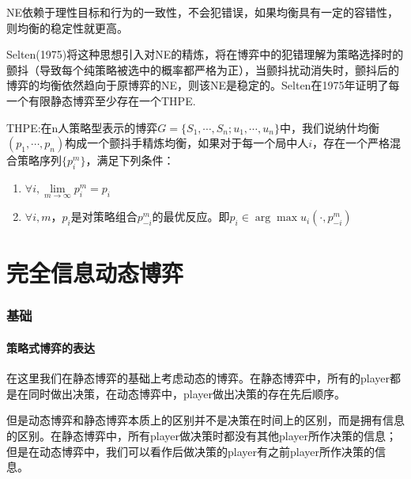\documentclass[UTF8,12pt]{ctexart}
\numberwithin{equation}{section} %
\numberwithin{figure}{section}
\numberwithin{table}{section}
\begin{document}
	NE依赖于理性目标和行为的一致性，不会犯错误，如果均衡具有一定的容错性，则均衡的稳定性就更高。
	
	Selten(1975)将这种思想引入对NE的精炼，将在博弈中的犯错理解为策略选择时的颤抖（导致每个纯策略被选中的概率都严格为正），当颤抖扰动消失时，颤抖后的博弈的均衡依然趋向于原博弈的NE，则该NE是稳定的。Selten在1975年证明了每一个有限静态博弈至少存在一个THPE.
	
	THPE:在n人策略型表示的博弈$G = \{S_1,\cdots,S_n;u_1,\cdots,u_n\}$中，我们说纳什均衡$(p_1,\cdots,p_n)$构成一个颤抖手精炼均衡，如果对于每一个局中人$i$，存在一个严格混合策略序列$\{p_i^m\}$，满足下列条件：
	\begin{enumerate}
		\item $\forall i,\lim\limits_{m \to \infty}p_i^m = p_i$
		
		\item $\forall i,m$，$p_i$是对策略组合$p^m_{-i}$的最优反应。即$p_i \in \arg \max u_i(\cdot,p^m_{-i})$
	\end{enumerate}

	\newpage
	
	\part{完全信息动态博弈}
	
	\section{基础}
	\subsection{策略式博弈的表达}
	在这里我们在静态博弈的基础上考虑动态的博弈。在静态博弈中，所有的player都是在同时做出决策，在动态博弈中，player做出决策的存在先后顺序。
	
	但是动态博弈和静态博弈本质上的区别并不是决策在时间上的区别，而是拥有信息的区别。在静态博弈中，所有player做决策时都没有其他player所作决策的信息；但是在动态博弈中，我们可以看作后做决策的player有之前player所作决策的信息。
	
\end{document}
